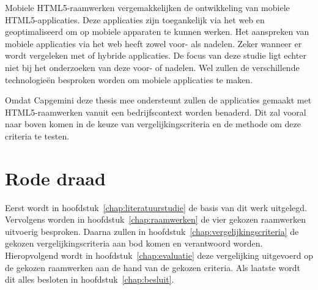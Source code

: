 Mobiele HTML5-raamwerken vergemakkelijken de ontwikkeling van mobiele HTML5-applicaties.
Deze applicaties zijn toegankelijk via het web en geoptimaliseerd om op mobiele apparaten te kunnen werken.
Het aanspreken van mobiele applicaties via het web heeft zowel voor- als nadelen.
Zeker wanneer er wordt vergeleken met  of hybride applicaties.
De focus van deze studie ligt echter niet bij het onderzoeken van deze voor- of nadelen.
Wel zullen de verschillende technologieën besproken worden om mobiele applicaties te maken.

Omdat Capgemini deze thesis mee ondersteunt zullen de applicaties gemaakt met HTML5-raamwerken vanuit een bedrijfscontext worden benaderd.
Dit zal vooral naar boven komen in de keuze van vergelijkingscriteria en de methode om deze criteria te testen.


\section{Rode draad} %
Eerst wordt in hoofdstuk~\ref{chap:literatuurstudie} de basis van dit werk uitgelegd.
Vervolgens worden in hoofdstuk~\ref{chap:raamwerken} de vier gekozen raamwerken uitvoerig besproken.
Daarna zullen in hoofdstuk~\ref{chap:vergelijkingscriteria} de gekozen vergelijkingscriteria aan bod komen en verantwoord worden.
Hieropvolgend wordt in hoofdstuk~\ref{chap:evaluatie} deze vergelijking uitgevoerd op de gekozen raamwerken aan de hand van de gekozen criteria.
Als laatste wordt dit alles besloten in hoofdstuk~\ref{chap:besluit}.

